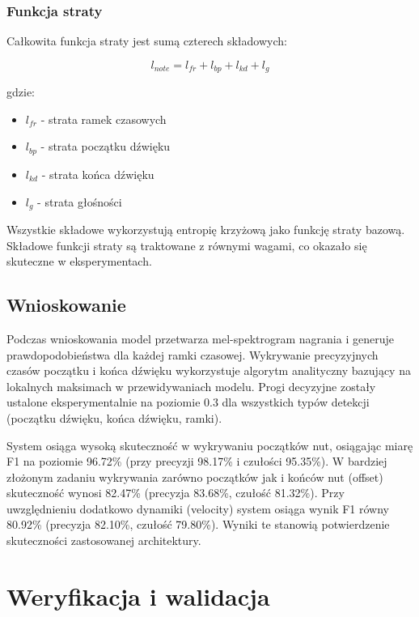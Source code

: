 \documentclass[a4paper,twoside,12pt]{book}
\begin{document}
\subsection{Funkcja straty}

Całkowita funkcja straty jest sumą czterech składowych:

\begin{equation}
l_{note} = l_{fr} + l_{bp} + l_{kd} + l_{g}
\end{equation}

gdzie:
\begin{itemize}
   \item $l_{fr}$ - strata ramek czasowych
   \item $l_{bp}$ - strata początku dźwięku
   \item $l_{kd}$ - strata końca dźwięku
   \item $l_{g}$ - strata głośności
\end{itemize}

Wszystkie składowe wykorzystują entropię krzyżową jako funkcję straty bazową. Składowe funkcji straty są traktowane z równymi wagami, co okazało się skuteczne w eksperymentach.

\section{Wnioskowanie}

Podczas wnioskowania model przetwarza mel-spektrogram nagrania i generuje prawdopodobieństwa dla każdej ramki czasowej. Wykrywanie precyzyjnych czasów początku i końca dźwięku wykorzystuje algorytm analityczny bazujący na lokalnych maksimach w przewidywaniach modelu. Progi decyzyjne zostały ustalone eksperymentalnie na poziomie 0.3 dla wszystkich typów detekcji (początku dźwięku, końca dźwięku, ramki).

System osiąga wysoką skuteczność w wykrywaniu początków nut, osiągając miarę F1 na poziomie 96.72\% (przy precyzji 98.17\% i czułości 95.35\%). W bardziej złożonym zadaniu wykrywania zarówno początków jak i końców nut (offset) skuteczność wynosi 82.47\% (precyzja 83.68\%, czułość 81.32\%). Przy uwzględnieniu dodatkowo dynamiki (velocity) system osiąga wynik F1 równy 80.92\% (precyzja 82.10\%, czułość 79.80\%). Wyniki te stanowią potwierdzenie skuteczności zastosowanej architektury.



\chapter{Weryfikacja i walidacja}
\label{ch:wer-wal}
\end{document}
